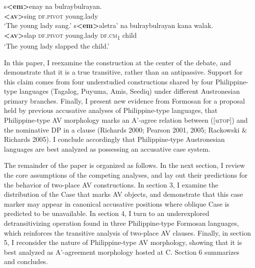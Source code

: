 \documentclass[10pt]{article}
\begin{document}
 \begin{exe}
 \begin{xlist}
\ex 
\gll s\textbf{<em>}enay na bulraybulrayan. \hspace{55mm}{[1-place]}\\
    \textsc{\textbf{<av>}}sing \textsc{df.pivot} young.lady\\
    \trans `The young lady sang.'
    \ex
    \gll s\textbf{<em>}aletra' na bulraybulrayan kana walak. \hspace{31mm}{[2-place]}\\
    \textsc{\textbf{<av>}}slap \textsc{df.pivot} young.lady \textsc{df.cm}\textsubscript{1} child\\
    \trans `The young lady slapped the child.'

     
 \end{xlist}
 
 \end{exe}
 
In this paper, I reexamine the construction at the center of the debate, and demonstrate that it is a true transitive, rather than an antipassive. Support for this claim comes from four understudied constructions shared by four Philippine-type languages (Tagalog, Puyuma, Amis, Seediq) under different Austronesian primary branches. Finally, I present new evidence from Formosan for a proposal held by previous accusative analyses of Philippine-type languages, that Philippine-type AV morphology marks an A'-agree relation between ([u\textsc{top}]) and the nominative DP in a clause (Richards 2000; Pearson 2001, 2005; Rackowski \& Richards 2005). I conclude accordingly that Philippine-type Austronesian languages are best analyzed as possessing an accusative case system.

The remainder of the paper is organized as follows. In the next section, I review the core assumptions of the competing analyses, and lay out their predictions for the behavior of two-place AV constructions. In section 3, I examine the distribution of the Case that marks AV objects, and demonstrate that this case marker may appear in canonical accusative positions where oblique Case is predicted to be unavailable. In section 4, I turn to an underexplored detransitivizing operation found in three Philippine-type Formosan languages, which reinforces the transitive analysis of two-place AV clauses. Finally, in section 5, I reconsider the nature of Philippine-type AV morphology, showing that it is best analyzed as A'-agreement morphology hosted at C. Section 6 summarizes and concludes.
\end{document}
